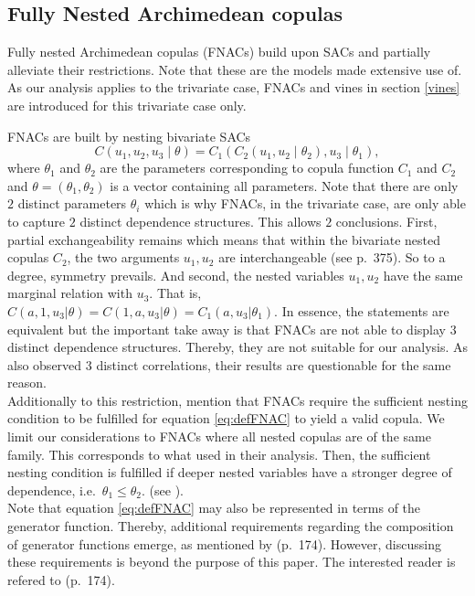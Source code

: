 \documentclass[
]{krantz}
\begin{document}
\subsection{Fully Nested Archimedean copulas}\label{nacs}

Fully nested Archimedean copulas (FNACs) build upon SACs
and partially alleviate their restrictions.
Note that these are the models \citet{grimaldi2006} made extensive use of.\\
As our analysis applies to the trivariate case, FNACs and vines in section \ref{vines} are introduced
for this trivariate case only.

FNACs are built by nesting bivariate SACs\\
\[
C(u_1, u_2, u_3 \mid \theta) = C_1\left( C_2(u_1, u_2 \mid \theta_2), u_3 \mid \theta_1 \right),
\label{eq:defFNAC} 
\]
where \(\theta_1\) and \(\theta_2\) are the parameters corresponding to copula function \(C_1\) and \(C_2\) and
\(\theta = (\theta_1, \theta_{2})\) is a vector containing all parameters.
Note that there are only \(2\) distinct parameters \(\theta_i\) which is why FNACs, in the trivariate
case, are only able to capture \(2\) distinct dependence structures.
This allows \(2\) conclusions. First, partial exchangeability remains which means that
within the bivariate nested copulas \(C_2\), the two arguments \(u_1, u_2\) are
interchangeable (see \citet{embrecht2003} p.~375). So to a degree, symmetry
prevails.
And second, the nested variables \(u_1, u_2\) have the same marginal relation with \(u_3\).
That is, \(C(a, 1, u_3|\theta) = C(1, a, u_3 | \theta) = C_1(a, u_3|\theta_1)\).
In essence, the statements are equivalent but the important take away is that FNACs are not
able to display \(3\) distinct dependence structures. Thereby, they are not suitable for our analysis.
As also \citet{grimaldi2006} observed \(3\) distinct correlations, their results are questionable for the same reason.\\
Additionally to this restriction, \citet{hofert2016} mention that FNACs
require the sufficient nesting condition to be fulfilled for equation \eqref{eq:defFNAC} to yield a valid copula.
We limit our considerations to FNACs where all nested copulas are of the same family.
This corresponds to what \citet{grimaldi2006} used in their analysis.
Then, the sufficient nesting condition is fulfilled if
deeper nested variables have a stronger degree of dependence, i.e.~\(\theta_1 \leq \theta_{2}\).
(see \citet{grimaldi2006}).\\
Note that equation \eqref{eq:defFNAC} may also be represented in terms of the generator function. Thereby, additional requirements
regarding the composition of generator functions emerge, as mentioned by \citet{zhang2019} (p.~174).
However, discussing these requirements is beyond the purpose of this paper. The interested reader is refered to \citet{zhang2019} (p.~174).
\end{document}

